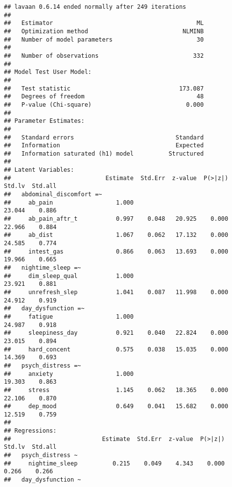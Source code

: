 \documentclass[
  man]{apa6}
\begin{document}
\begin{verbatim}
## lavaan 0.6.14 ended normally after 249 iterations
## 
##   Estimator                                         ML
##   Optimization method                           NLMINB
##   Number of model parameters                        30
## 
##   Number of observations                           332
## 
## Model Test User Model:
##                                                       
##   Test statistic                               173.087
##   Degrees of freedom                                48
##   P-value (Chi-square)                           0.000
## 
## Parameter Estimates:
## 
##   Standard errors                             Standard
##   Information                                 Expected
##   Information saturated (h1) model          Structured
## 
## Latent Variables:
##                           Estimate  Std.Err  z-value  P(>|z|)   Std.lv  Std.all
##   abdominal_discomfort =~                                                      
##     ab_pain                  1.000                              23.044    0.886
##     ab_pain_aftr_t           0.997    0.048   20.925    0.000   22.966    0.884
##     ab_dist                  1.067    0.062   17.132    0.000   24.585    0.774
##     intest_gas               0.866    0.063   13.693    0.000   19.966    0.665
##   nightime_sleep =~                                                            
##     dim_sleep_qual           1.000                              23.921    0.881
##     unrefresh_slep           1.041    0.087   11.998    0.000   24.912    0.919
##   day_dysfunction =~                                                           
##     fatigue                  1.000                              24.987    0.918
##     sleepiness_day           0.921    0.040   22.824    0.000   23.015    0.894
##     hard_concent             0.575    0.038   15.035    0.000   14.369    0.693
##   psych_distress =~                                                            
##     anxiety                  1.000                              19.303    0.863
##     stress                   1.145    0.062   18.365    0.000   22.106    0.870
##     dep_mood                 0.649    0.041   15.682    0.000   12.519    0.759
## 
## Regressions:
##                          Estimate  Std.Err  z-value  P(>|z|)   Std.lv  Std.all
##   psych_distress ~                                                            
##     nightime_sleep          0.215    0.049    4.343    0.000    0.266    0.266
##   day_dysfunction ~                                                           

\end{verbatim}
\end{document}
